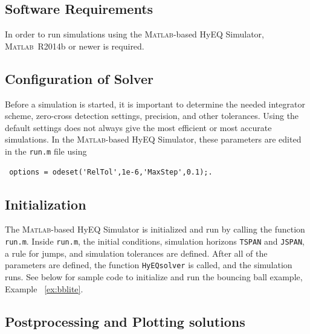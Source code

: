 \documentclass{article}
\newcommand{\matlab}{\textsc{Matlab}}
\newcommand{\ricardo}[1]{{\color{blue} #1}}
\begin{document}

\subsection{Software Requirements}

In order to run simulations using the \matlab{}-based HyEQ Simulator, 
\matlab{}~R2014b or newer is required.

\subsection{Configuration of Solver}

Before a simulation is started, it is important to determine the needed integrator scheme, 
zero-cross detection settings, precision, and other tolerances. 
Using the default settings does not always give the most efficient or most accurate simulations.
In the \matlab{}-based HyEQ Simulator, these parameters are edited in the {\tt run.m} file using

\begin{verbatim} options = odeset('RelTol',1e-6,'MaxStep',0.1);. \end{verbatim}

\subsection{Initialization}


The \matlab{}-based HyEQ Simulator is initialized and run by calling the function {\tt run.m}. 
Inside {\tt run.m}, the initial conditions, simulation horizons {\tt TSPAN} 
and {\tt JSPAN}, a rule for jumps, and simulation tolerances are defined. 
After all of the parameters are defined, the function {\tt HyEQsolver} is called, 
and the simulation runs. See below for sample code to initialize and run the bouncing ball example, 
Example ~\ref{ex:bblite}.\\

% 
\label{scr:initialization}


\subsection{Postprocessing and Plotting solutions}\label{sec:plotfcn}
\end{document}
